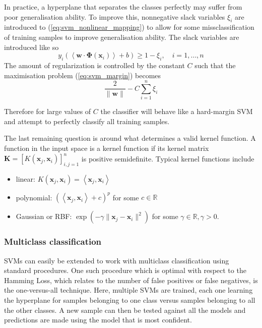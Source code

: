 In practice, a hyperplane that separates the classes perfectly may suffer from
poor generalisation ability. To improve this, nonnegative slack variables
$\xi_i$ are introduced to (\ref{eq:svm_nonlinear_mapping}) to allow for some
missclassification of training samples to improve generalisation
ability. The slack variables are introduced like so
\begin{equation}\label{eq:svm_nonlinear_mapping_slack}
y_i\left( \left< \mathbf{w} \cdot \boldsymbol{\Phi}(\mathbf{x}_i) \right> + b
\right) \ge 1 - \xi_i, \hspace{1em}
i = 1,\ldots,n
\end{equation}
The amount of regularization is controlled by the constant $C$ such that the
maximisation problem (\ref{eq:svm_margin}) becomes
\begin{equation}
\frac{2}{\|\mathbf{w}\|} - C \sum_{i=1}^{n} \xi_i
\end{equation}

Therefore for large values of $C$ the classifier will behave like a hard-margin
SVM and attempt to perfectly classify all training samples.

The last remaining question is around what determines a valid kernel function. A
function in the input space is a kernel function if its kernel matrix
$\mathbf{K} = \left[ K(\mathbf{x}_j,\mathbf{x}_i) \right]^{n}_{i,j=1}$ is
positive semidefinite. Typical kernel functions include
\begin{itemize}

  \item linear: $K(\mathbf{x}_j,\mathbf{x}_i) = \left< \mathbf{x}_j, \mathbf{x}_i \right>$

  \item polynomial: $\left(\left< \mathbf{x}_j, \mathbf{x}_i \right> + c\right)^p$
    for some $c \in \mathbb{R}$

  \item Gaussian or RBF\@: $\exp \left( -\gamma \|\mathbf{x}_j-\mathbf{x}_i\|^2 \right)$
    for some $\gamma \in \mathbb{R}, \gamma > 0$.

\end{itemize}

\subsubsection{Multiclass classification}\label{sssec:multiclass}

SVMs can easily be extended to work with multiclass classification using
standard procedures. One such procedure which is optimal with respect to the
Hamming Loss, which relates to the number of false positives or false negatives,
is the one-versus-all technique. Here, multiple SVMs are trained, each one
learning the hyperplane for samples belonging to one class versus samples
belonging to all the other classes. A new sample can then be tested against all
the models and predictions are made using the model that is most confident.

